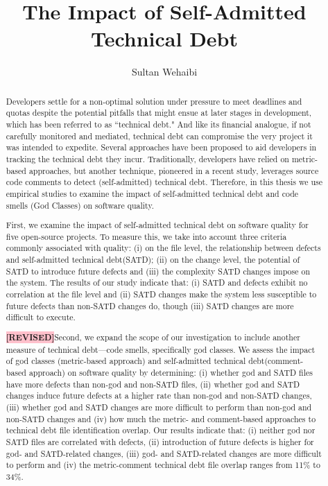 \documentclass[12pt]{report}
\author{Sultan Wehaibi}
\title {The Impact of Self-Admitted Technical Debt}
\newcommand{\SATD}{self-admitted technical debt\xspace}
\newcommand{\revision}{\textbf{\colorbox{pink}{[REVISED]}}}
\begin{document}
\begin{abstract}
	
	

Developers settle for a non-optimal solution under pressure to meet deadlines and quotas despite the potential pitfalls that might ensue at later stages in development, which has been referred to as ``technical debt." And like its financial analogue, if not carefully monitored and mediated, technical debt can compromise the very project it was intended to expedite. Several approaches have been proposed to aid developers in tracking the technical debt they incur. Traditionally, developers have relied on metric-based approaches, but another technique, pioneered in a recent study, leverages source code comments to detect (self-admitted) technical debt. Therefore, in this thesis we use empirical studies to examine the impact of self-admitted technical debt and code smells (God Classes) on software quality.

First, we examine the impact of \SATD on software quality for five open-source projects. To measure this, we take into account three criteria commonly associated with quality: (i) on the file level, the relationship between defects and \SATD (SATD); (ii) on the change level, the potential of SATD to introduce future defects and (iii) the complexity SATD changes impose on the system. The results of our study indicate that: (i) SATD and defects exhibit no correlation at the file level and (ii) SATD changes make the system less susceptible to future defects than non-SATD changes do, though (iii) SATD changes are more difficult to execute.

\revision Second, we expand the scope of our investigation to include another measure of technical debt---code smells, specifically god classes. We assess the impact of god classes (metric-based approach) and \SATD (comment-based approach) on software quality by determining: (i) whether god and SATD files have more defects than non-god and non-SATD files, (ii) whether god and SATD changes induce future defects at a higher rate than non-god and non-SATD changes, (iii) whether god and SATD changes are more difficult to perform than non-god and non-SATD changes and (iv) how much the metric- and comment-based approaches to technical debt file identification overlap. Our results indicate that: (i) neither god nor SATD files are correlated with defects, (ii) introduction of future defects is higher for god- and SATD-related changes, (iii) god- and SATD-related changes are more difficult to perform and (iv) the metric-comment technical debt file overlap ranges from 11\% to 34\%.


\end{abstract}
\end{document}
